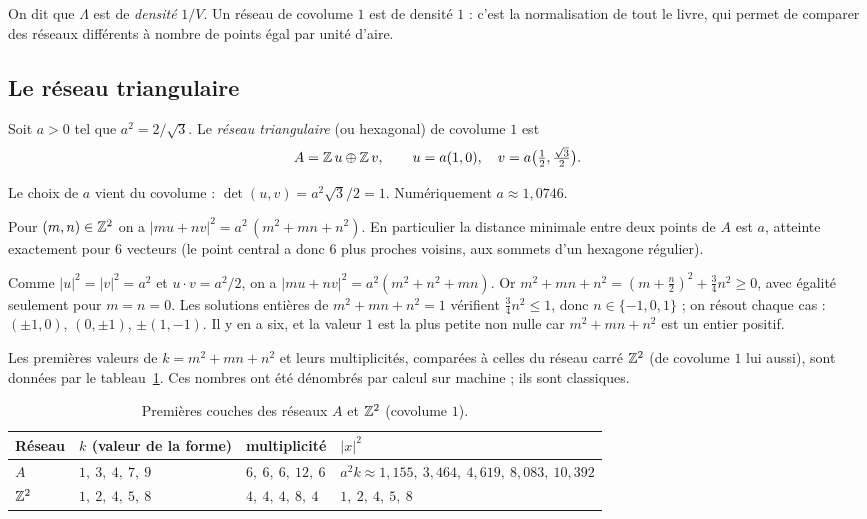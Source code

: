 On dit que $\Lambda$ est de \emph{densité} $1/V$. Un réseau de covolume $1$ est de densité $1$ : c'est la normalisation
de tout le livre, qui permet de comparer des réseaux différents à nombre de points égal par unité d'aire.

\subsection{Le réseau triangulaire}

\begin{definition}\label{ch1:def:A}
Soit $a>0$ tel que $a^2=2/\sqrt3$. Le \emph{réseau triangulaire} (ou hexagonal) de covolume $1$ est
\[
  A=\mathbb{Z}\,u\oplus\mathbb{Z}\,v,\qquad u=a(1,0),\quad v=a\bigl(\tfrac12,\tfrac{\sqrt3}{2}\bigr).
\]
\end{definition}

Le choix de $a$ vient du covolume : $\det(u,v)=a^2\sqrt3/2=1$. Numériquement $a\approx 1{,}0746$.

\begin{proposition}\label{ch1:prop:normesA}
Pour $(m,n)\in\mathbb{Z}^2$ on a $|mu+nv|^2=a^2\,(m^2+mn+n^2)$. En particulier la distance minimale entre deux points de $A$ est $a$, atteinte
exactement pour $6$ vecteurs (le point central a donc $6$ plus proches voisins, aux sommets d'un hexagone régulier). \tierC{}
\end{proposition}

\begin{humanproof}
Comme $|u|^2=|v|^2=a^2$ et $u\cdot v=a^2/2$, on a $|mu+nv|^2=a^2(m^2+n^2+mn)$. Or
$m^2+mn+n^2=(m+\tfrac n2)^2+\tfrac34n^2\ge0$, avec égalité seulement pour $m=n=0$. Les solutions entières de
$m^2+mn+n^2=1$ vérifient $\tfrac34 n^2\le 1$, donc $n\in\{-1,0,1\}$ ; on résout chaque cas : $(\pm1,0)$, $(0,\pm1)$,
$\pm(1,-1)$. Il y en a six, et la valeur $1$ est la plus petite non nulle car $m^2+mn+n^2$ est un entier positif.
\end{humanproof}

Les premières valeurs de $k=m^2+mn+n^2$ et leurs multiplicités, comparées à celles du réseau carré $\mathbb{Z}^2$ (de covolume $1$ lui aussi),
sont données par le tableau~\ref{ch1:tab:couches}. Ces nombres ont été dénombrés par calcul sur machine \tierX{} ; ils sont classiques.

\begin{table}[ht]
\centering
\begin{tabular}{@{}llll@{}}
\toprule
Réseau & $k$ (valeur de la forme) & multiplicité & $|x|^2$ \\
\midrule
$A$ & $1,\ 3,\ 4,\ 7,\ 9$ & $6,\ 6,\ 6,\ 12,\ 6$ & $a^2k\approx 1{,}155,\ 3{,}464,\ 4{,}619,\ 8{,}083,\ 10{,}392$ \\
$\mathbb{Z}^2$ & $1,\ 2,\ 4,\ 5,\ 8$ & $4,\ 4,\ 4,\ 8,\ 4$ & $1,\ 2,\ 4,\ 5,\ 8$ \\
\bottomrule
\end{tabular}
\caption{Premières couches des réseaux $A$ et $\mathbb{Z}^2$ (covolume $1$).}
\label{ch1:tab:couches}
\end{table}


